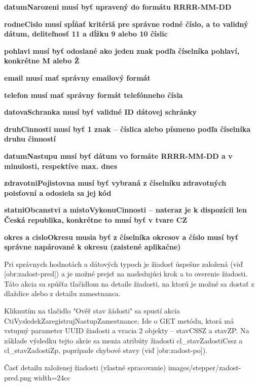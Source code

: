 \startitemize
\item{\start\bf datumNarozeni  \stop musí byť upravený do formátu RRRR-MM-DD} 
\item{\start\bf rodneCislo  \stop musí spĺňať kritériá pre správne rodné číslo, a to validný dátum, deliteľnosť 11 a dĺžku 9 alebo 10 číslic} 
\item{\start\bf pohlavi \stop musí byť odoslané ako jeden znak podľa číselníka pohlaví, konkrétne M alebo Ž} 
\item{\start\bf email \stop musí mať správny emailový formát}  
\item{\start\bf telefon \stop musí mať správny formát telefónneho čísla} 
\item{\start\bf datovaSchranka \stop musí byť validné ID dátovej schránky}  
\item{\start\bf druhCinnosti \stop musí byť 1 znak -- číslica alebo písmeno podľa číselníka druhu činností}  
\item{\start\bf datumNastupu \stop musí byť dátum vo formáte RRRR-MM-DD a v minulosti, respektíve max. dnes}  
\item{\start\bf zdravotniPojistovna \stop musí byť vybraná z číselníku zdravotných poisťovní a odosiela sa jej kód}  
\item{\start\bf statniObcanstvi a mistoVykonuCinnosti \stop -- nateraz je k dispozícii len Česká republika, konkrétne to musí byť v tvare CZ}  
\item{\start\bf okres a cisloOkresu \stop musia byť z číselníka okresov a číslo musí byť správne napárované k okresu (zaistené aplikačne)}  
\stopitemize



Pri správnych hodnotách a dátových typoch je žiadosť úspešne založená (viď [obr:zadost-pred]) a je možné prejsť na nasledujúci krok a to overenie žiadosti. Táto akcia sa spúšťa tlačidlom na detaile žiadosti, na ktorú je možné sa dostať z dlaždice alebo z detailu zamestnanca. 

Kliknutím na tlačidlo "Ověř stav žádosti" sa spustí akcia CtiVysledekZaregistrujNastupZamestnance. Ide o GET metódu, ktorá má vstupný parameter UUID žiadosti a vracia 2 objekty -- stavCSSZ a stavZP. Na základe výsledku tejto akcie sa menia atribúty žiadosti cl_stavZadostiCssz a cl_stavZadostiZp, poprípade chybové stavy (viď [obr:zadost-po]).

{Časť detailu založenej žiadosti (vlastné spracovanie)}
{images/stepper/zadost-pred.png}
{width=24cc}

